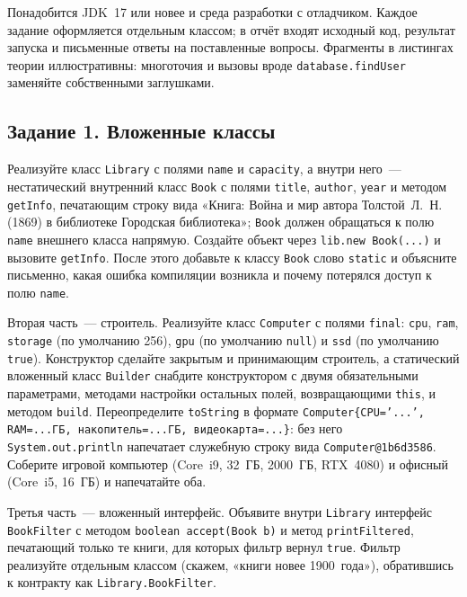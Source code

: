 \praktikum{}

Понадобится JDK~17 или новее и среда разработки с отладчиком. Каждое задание
оформляется отдельным классом; в отчёт входят исходный код, результат запуска и
письменные ответы на поставленные вопросы. Фрагменты в листингах теории
иллюстративны: многоточия и вызовы вроде \texttt{database.findUser} заменяйте
собственными заглушками.

\subsection*{Задание 1. Вложенные классы}

Реализуйте класс \texttt{Library} с полями \texttt{name} и \texttt{capacity}, а
внутри него~--- нестатический внутренний класс \texttt{Book} с полями
\texttt{title}, \texttt{author}, \texttt{year} и методом \texttt{getInfo},
печатающим строку вида «Книга: Война и мир автора Толстой~Л.~Н. (1869) в
библиотеке Городская библиотека»; \texttt{Book} должен обращаться к полю
\texttt{name} внешнего класса напрямую. Создайте объект через
\texttt{lib.new Book(...)} и вызовите \texttt{getInfo}. После этого добавьте к
классу \texttt{Book} слово \texttt{static} и объясните письменно, какая ошибка
компиляции возникла и почему потерялся доступ к полю \texttt{name}.

Вторая часть~--- строитель. Реализуйте класс \texttt{Computer} с полями
\texttt{final}: \texttt{cpu}, \texttt{ram}, \texttt{storage} (по умолчанию 256),
\texttt{gpu} (по умолчанию \texttt{null}) и \texttt{ssd} (по умолчанию
\texttt{true}). Конструктор сделайте закрытым и принимающим строитель, а
статический вложенный класс \texttt{Builder} снабдите конструктором с двумя
обязательными параметрами, методами настройки остальных полей, возвращающими
\texttt{this}, и методом \texttt{build}. Переопределите \texttt{toString} в
формате \texttt{Computer\{CPU='...', RAM=...ГБ, накопитель=...ГБ,
видеокарта=...\}}: без него \texttt{System.out.println} напечатает служебную
строку вида \texttt{Computer@1b6d3586}. Соберите игровой компьютер (Core~i9,
32~ГБ, 2000~ГБ, RTX~4080) и офисный (Core~i5, 16~ГБ) и напечатайте оба.

Третья часть~--- вложенный интерфейс. Объявите внутри \texttt{Library}
интерфейс \texttt{BookFilter} с методом \texttt{boolean accept(Book b)} и метод
\texttt{printFiltered}, печатающий только те книги, для которых фильтр вернул
\texttt{true}. Фильтр реализуйте отдельным классом (скажем, «книги новее
1900~года»), обратившись к контракту как \texttt{Library.BookFilter}.

